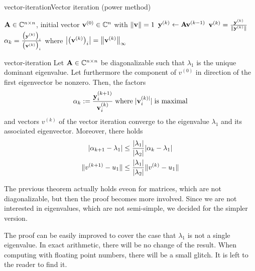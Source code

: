 \begin{Algorithm*}{vector-iteration}{Vector iteration (power method)}
  \begin{algorithmic}[1]
    \Require $\mata\in\Cnn$, initial vector $\vv^{(0)}\in\C^n$ with $\norm{\vv}=1$
    \State $\vy^{(k)} \gets \mata \vv^{(k-1)}$
    \State $\vv^{(k)} = \frac{\vy^{(k)}}{\norm{\vy^{(k)}}}$
    \State $\alpha_k = \frac{\bigl(\vy^{(k)}\bigr)_i}{\bigl(\vv^{(k)}\bigr)_i}$ where $\abs*{\bigl(\vv^{(k)}\bigr)_i} = \norm*{\vv^{(k)}}_\infty $
    \EndFor
  \end{algorithmic}
\end{Algorithm*}

\begin{Theorem}{vector-iteration}
  Let $\mata\in\Cnn$ be diagonalizable such that $\lambda_1$ is the
  unique dominant eigenvalue. Let furthermore the
  component of $v^{(0)}$ in direction of the first eigenvector be
  nonzero. Then, the factors
  \[\alpha_k := \frac{\vy^{(k+1)}_i}{\vv_i^{(k)}} \; \text{where} \; |\vv_i^{(k)|}| \; \text{is maximal}\]
  and vectors $v^{(k)}$ of the
  vector iteration converge to the eigenvalue $\lambda_1$ and its
  associated eigenvector. Moreover, there holds
  \begin{align}
    \abs{\alpha_{k+1}-\lambda_1}
    &\le \frac{\abs{\lambda_1}}{\abs{\lambda_2}} \abs{\alpha_{k}-\lambda_1}\\
    \norm{v^{(k+1)}-u_1}
    &\le \frac{\abs{\lambda_1}}{\abs{\lambda_2}} \norm{v^{(k)}-u_1}
  \end{align}
\end{Theorem}

\begin{remark}
  The previous theorem actually holds eveon for matrices, which are
  not diagonalizable, but then the proof becomes more involved. Since
  we are not interested in eigenvalues, which are not semi-simple, we
  decided for the simpler version.

  The proof can be easily improved to cover the case that $\lambda_1$
  is not a single eigenvalue. In exact arithmetic, there will be no
  change of the result. When computing with floating point numbers,
  there will be a small glitch. It is left to the reader to find it.
\end{remark}

